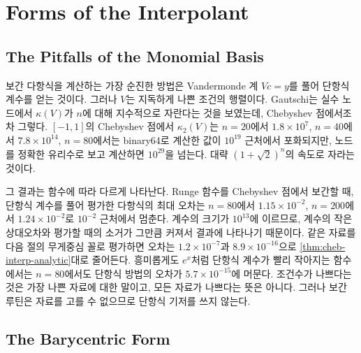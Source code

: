 \section{Forms of the Interpolant}
\label{sec:interp-forms}

\subsection{The Pitfalls of the Monomial Basis}

보간 다항식을 계산하는 가장 순진한 방법은 Vandermonde 계 $Vc=y$를 풀어 단항식 계수를 얻는 것이다. 그러나 $V$는 지독하게 나쁜 조건의 행렬이다. Gautschi는 실수 노드에서 $\kappa(V)$가 $n$에 대해 지수적으로 자란다는 것을 보였는데\cite{gautschi1975vandermonde}, Chebyshev 점에서조차 그렇다. $[-1,1]$의 Chebyshev 점에서 $\kappa_2(V)$는 $n=20$에서 $1.8\times10^7$, $n=40$에서 $7.8\times10^{14}$, $n=80$에서는 binary64로 계산한 값이 $10^{19}$ 근처에서 포화되지만, 노드를 정확한 유리수로 보고 계산하면 $10^{29}$을 넘는다. 대략 $(1+\sqrt2)^n$의 속도로 자라는 것이다.

그 결과는 함수에 따라 다르게 나타난다. Runge 함수를 Chebyshev 점에서 보간할 때, 단항식 계수를 풀어 평가한 다항식의 최대 오차는 $n=80$에서 $1.15\times10^{-2}$, $n=200$에서 $1.24\times10^{-2}$로 $10^{-2}$ 근처에서 멈춘다. 계수의 크기가 $10^{13}$에 이르므로, 계수의 작은 상대오차와 평가할 때의 소거가 그만큼 커져서 결과에 나타나기 때문이다. 같은 자료를 다음 절의 무게중심 꼴로 평가하면 오차는 $1.2\times10^{-7}$과 $8.9\times10^{-16}$으로 \cref{thm:cheb-interp-analytic}대로 줄어든다. 흥미롭게도 $e^x$처럼 단항식 계수가 빨리 작아지는 함수에서는 $n=80$에서도 단항식 방법의 오차가 $5.7\times10^{-15}$에 머문다. 조건수가 나쁘다는 것은 가장 나쁜 자료에 대한 말이고, 모든 자료가 나쁘다는 뜻은 아니다. 그러나 보간 루틴은 자료를 고를 수 없으므로 단항식 기저를 쓰지 않는다.

\subsection{The Barycentric Form}

